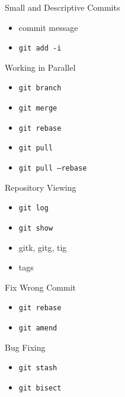 \documentclass{beamer}
\begin{document}
\begin{frame}{Small and Descriptive Commits}
  \begin{itemize}
    \item commit message
    \item \texttt{git add -i}
  \end{itemize}
\end{frame}

\begin{frame}{Working in Parallel}
  \vspace{-2cm}\hspace{5cm}
  \hspace{-5cm}\vspace{-6cm}
  \begin{itemize}
    \item \texttt{git branch}
    \item \texttt{git merge}
    \item \texttt{git rebase}
    \pause
    \item \texttt{git pull}
    \item \texttt{git pull --rebase}
  \end{itemize}
\end{frame}

\begin{frame}{Repository Viewing}
  \begin{itemize}
    \item \texttt{git log}
    \item \texttt{git show}
    \item gitk, gitg, tig
    \item tags
  \end{itemize}
\end{frame}

\begin{frame}{Fix Wrong Commit}
  \begin{itemize}
    \item \texttt{git rebase}
    \item \texttt{git amend}
  \end{itemize}
\end{frame}

\begin{frame}{Bug Fixing}
  \begin{itemize}
    \item \texttt{git stash}
    \item \texttt{git bisect}
  \end{itemize}
\end{frame}
\end{document}
